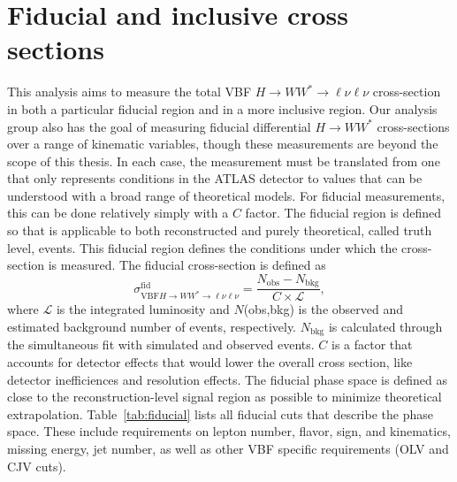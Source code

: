 \section{Fiducial and inclusive cross sections}
This analysis aims to measure the total VBF $H\rightarrow WW^*\rightarrow\ell\nu\ell\nu$ cross-section in both a particular fiducial region and in a more inclusive region. Our analysis group also has the goal of measuring fiducial differential $H\rightarrow WW^*$ cross-sections over a range of kinematic variables, though these measurements are beyond the scope of this thesis. In each case, the measurement must be translated from one that only represents conditions in the ATLAS detector to values that can be understood with a broad range of theoretical models. For fiducial measurements, this can be done relatively simply with a $C$ factor. The fiducial region is defined so that is applicable to both reconstructed and purely theoretical, called truth level, events. This fiducial region defines the conditions under which the cross-section is measured. The fiducial cross-section is defined as
\begin{equation}
\sigma_{\text{VBF}H\rightarrow WW^*\rightarrow\ell\nu\ell\nu}^{\text{fid}} = \frac{N_{\text{obs}}-N_{\text{bkg}}}{C\times\mathcal{L}},
\end{equation} 
where $\mathcal{L}$ is the integrated luminosity and $N$(obs,bkg) is the observed and estimated background number of events, respectively. $N_{\text{bkg}}$ is calculated through the simultaneous fit with simulated and observed events. $C$ is a factor that accounts for detector effects that would lower the overall cross section, like detector inefficiences and resolution effects. The fiducial phase space is defined as close to the reconstruction-level signal region as possible to minimize theoretical extrapolation. Table~\ref{tab:fiducial} lists all fiducial cuts that describe the phase space. These include requirements on lepton number, flavor, sign, and kinematics, missing energy, jet number, as well as other VBF specific requirements (OLV and CJV cuts). 
